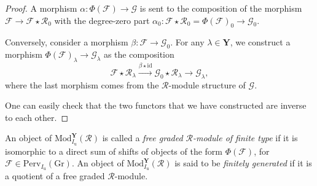 \documentclass[11pt]{amsart}
\theoremstyle{plain}
\theoremstyle{remark}
\numberwithin{equation}{section}
\begin{document}
\begin{proof}
    A morphism $\alpha:\Phi(\mathcal{F})\to \mathcal{G}$ is sent to the composition of the morphism $\mathcal{F}\to \mathcal{F}\star\mathcal{R}_0$ with the degree-zero part $\alpha_0:\mathcal{F}\star\mathcal{R}_0=\Phi(\mathcal{F})_0\to \mathcal{G}_0$. 
    
    Conversely, consider a morphism $\beta:\mathcal{F}\to \mathcal{G}_0$. For any $\lambda\in\mathbf{Y}$, we construct a morphism $\Phi(\mathcal{F})_\lambda\to \mathcal{G}_\lambda$ as the composition
    $$\mathcal{F}\star\mathcal{R}_\lambda\xrightarrow{\beta\star\mathrm{id}}\mathcal{G}_0\star\mathcal{R}_\lambda\to \mathcal{G}_\lambda, $$
    where the last morphism comes from the $\mathcal{R}$-module structure of $\mathcal{G}$.

    One can easily check that the two functors that we have constructed are inverse to each other.
\end{proof}	
An object of $\mathrm{Mod}^\mathbf{Y}_{I_\mathrm{u}}(\mathcal{R})$ is called a \textit{free graded $\mathcal{R}$-module of finite type} if it is isomorphic to a direct sum of shifts of objects of the form $\Phi(\mathcal{F})$, for $\mathcal{F}\in\mathrm{Perv}_{I_\mathrm{u}}(\mathrm{Gr})$.  An object of $\mathrm{Mod}^\mathbf{Y}_{I_\mathrm{u}}(\mathcal{R})$ is said to be \textit{finitely generated} if it is  a quotient of a free graded $\mathcal{R}$-module.
\end{document}
